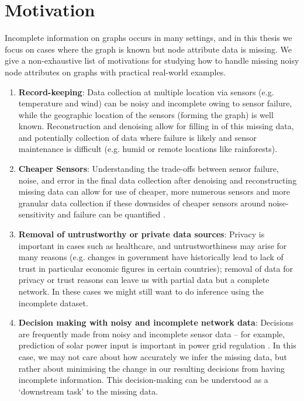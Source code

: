 
\section{Motivation}
Incomplete information on graphs occurs in many settings, and in this thesis we focus on cases where the graph is known but node attribute data is missing. We give a non-exhaustive list of motivations for studying how to handle missing noisy node attributes on graphs with practical real-world examples.

\begin{enumerate}
    \item \textbf{Record-keeping}: Data collection at multiple location via sensors (e.g. temperature and wind) can be noisy and incomplete owing to sensor failure, while the geographic location of the sensors (forming the graph) is well known. Reconstruction and denoising allow for filling in of this missing data, and potentially collection of data where failure is likely and sensor maintenance is difficult (e.g. humid or remote locations like rainforests).
    \item \textbf{Cheaper Sensors}: Understanding the trade-offs between sensor failure, noise, and error in the final data collection after denoising and reconstructing missing data can allow for use of cheaper, more numerous sensors and more granular data collection if these downsides of cheaper sensors around noise-sensitivity and failure can be quantified \cite{bush2023impact}.
    \item \textbf{Removal of untrustworthy or private data sources}:  Privacy is important in cases such as healthcare, and untrustworthiness may arise for many reasons (e.g. changes in government have historically lead to lack of trust in particular economic figures in certain countries); removal of data for privacy or trust reasons can leave us with partial data but a complete network. In these cases we might still want to do inference using the incomplete dataset.
    \item \textbf{Decision making with noisy and incomplete network data}: Decisions are frequently made from noisy and incomplete sensor data -- for example, prediction of solar power input is important in power grid regulation \cite{simeunovic2021spatio}. In this case, we may not care about how accurately we infer the missing data, but rather about minimising the change in our resulting decisions from having incomplete information. This decision-making can be understood as a `downstream task' to the missing data.

\end{enumerate}
